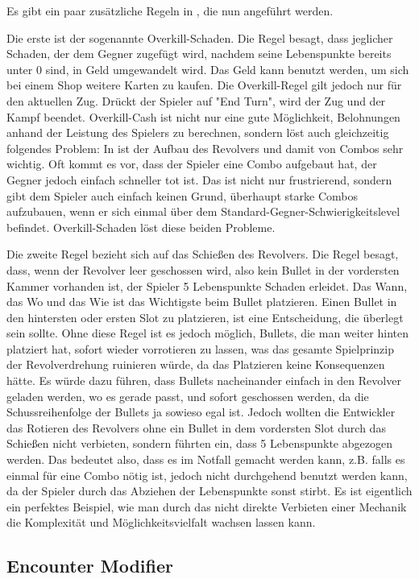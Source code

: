 Es gibt ein paar zusätzliche Regeln in \FF, die nun angeführt werden.


Die erste ist der sogenannte Overkill-Schaden.
Die Regel besagt, dass jeglicher Schaden, der dem Gegner zugefügt wird, nachdem seine Lebenspunkte bereits unter 0 sind,
in Geld umgewandelt wird. Das Geld kann benutzt werden, um sich bei einem Shop weitere Karten zu kaufen.
Die Overkill-Regel gilt jedoch nur für den aktuellen Zug. Drückt der Spieler auf "End Turn", wird der Zug und der Kampf beendet.
Overkill-Cash ist nicht nur eine gute Möglichkeit, Belohnungen anhand der Leistung des Spielers zu berechnen,
sondern löst auch gleichzeitig folgendes Problem: In \FF ist der Aufbau des Revolvers und damit von Combos sehr wichtig.
Oft kommt es vor, dass der Spieler eine Combo aufgebaut hat, der Gegner jedoch einfach schneller tot ist.
Das ist nicht nur frustrierend, sondern gibt dem Spieler auch einfach keinen Grund, überhaupt starke Combos aufzubauen,
wenn er sich einmal über dem Standard-Gegner-Schwierigkeitslevel befindet. Overkill-Schaden löst diese beiden Probleme.


Die zweite Regel bezieht sich auf das Schießen des Revolvers.
Die Regel besagt, dass, wenn der Revolver leer geschossen wird, also kein Bullet in der vordersten Kammer vorhanden ist,
der Spieler 5 Lebenspunkte Schaden erleidet. Das Wann, das Wo und das Wie ist das Wichtigste beim Bullet platzieren.
Einen Bullet in den hintersten oder ersten Slot zu platzieren, ist eine Entscheidung, die überlegt sein sollte.
Ohne diese Regel ist es jedoch möglich, Bullets, die man weiter hinten platziert hat, sofort wieder vorrotieren zu lassen,
was das gesamte Spielprinzip der Revolverdrehung ruinieren würde, da das Platzieren keine Konsequenzen hätte.
Es würde dazu führen, dass Bullets nacheinander einfach in den Revolver geladen werden, wo es gerade passt, und sofort
geschossen werden, da die Schussreihenfolge der Bullets ja sowieso egal ist. Jedoch wollten die Entwickler das Rotieren
des Revolvers ohne ein Bullet in dem vordersten Slot durch das Schießen nicht verbieten, sondern führten ein,
dass 5 Lebenspunkte abgezogen werden. Das bedeutet also, dass es im Notfall gemacht werden kann, z.B. falls es einmal für
eine Combo nötig ist, jedoch nicht durchgehend benutzt werden kann, da der Spieler durch das Abziehen der Lebenspunkte sonst stirbt.
Es ist eigentlich ein perfektes Beispiel, wie man durch das nicht direkte Verbieten einer Mechanik die Komplexität und
Möglichkeitsvielfalt wachsen lassen kann.


\subsection{Encounter Modifier}\label{encounter_modifier}

